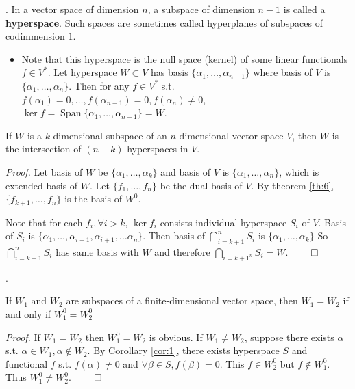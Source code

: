 \documentclass[8pt]{beamer}
\newcommand{\tb}[1]{\textbf{#1}}
\newcommand{\ti}[1]{\textit{#1}}
\newcommand{\Span}{\operatorname{Span}}
\begin{document}
\begin{frame}{.}
    In a vector space of dimension $n$, a subspace of dimension $n-1$ is called a \tb{hyperspace}.
    Such spaces are sometimes called hyperplanes of subspaces of codimmension $1$.

    \begin{itemize}
        \item Note that this hyperspace is the null space (kernel) of some linear functionals $f \in V^\ast$.
        Let hyperspace $W \subset V$ has basis $\{\alpha_1, \dots, \alpha_{n-1}\}$ where basis of $V$ is $\{\alpha_1, \dots, \alpha_n\}$.
        Then for any $f \in V^\ast$ s.t. $f(\alpha_1) =0, \dots, f(\alpha_{n-1}) = 0, f(\alpha_n) \neq 0$, $\ker f = \Span \{\alpha_1, \dots, \alpha_{n-1}\}= W$.
    \end{itemize}

    \begin{corollary} \label{cor:1}
        If $W$ is a $k$-dimensional subspace of an $n$-dimensional vector space $V$, then $W$ is the intersection of $(n-k)$ hyperspaces in $V$.
    \end{corollary}

    \ti{Proof.}
    Let basis of $W$ be $\{\alpha_1, \dots, \alpha_k\}$ and basis of $V$ is $\{\alpha_1, \dots, \alpha_n\}$, which is extended basis of $W$.
    Let $\{f_1, \dots, f_n\}$ be the dual basis of $V$.
    By theorem \ref{th:6}, $\{f_{k+1}, \dots, f_{n}\}$ is the basis of $W^0$.

    Note that for each $f_i, \forall i>k$, $\ker f_i$ consists individual hyperspace $S_i$ of $V$.
    Basis of $S_i$ is $\{\alpha_1, \dots, \alpha_{i-1}, \alpha_{i+1}, \dots \alpha_n\}$.
    Then basis of $\bigcap_{i={k+1}}^n S_i$ is $\{\alpha_1, \dots, \alpha_k\}$
    So $\bigcap_{i={k+1}}^n S_i$ has same basis with $W$ and therefore $\bigcap_{i={k+1}^n} S_i = W$.
    $\qed$
\end{frame}

\begin{frame}{.}
    \begin{corollary}
        If $W_1$ and $W_2$ are subspaces of a finite-dimensional vector space, then $W_1 = W_2$ if and only if $W_1^0 = W_2^0$
    \end{corollary}
    \ti{Proof.} If $W_1 = W_2$ then $W_1^0 = W_2^0$ is obvious.
    If $W_1 \neq W_2$, suppose there exists $\alpha$ s.t. $\alpha \in W_1, \alpha \notin W_2$.
    By Corollary \ref{cor:1}, there exists hyperspace $S$ and functional $f$ s.t. 
    $f(\alpha) \neq 0$  and $\forall \beta \in S, f(\beta) = 0$.
    This $f \in W_2^0$ but $f \notin W_1^0$.
    Thus $W^0_1 \neq W^0_2$.
    $\qed$
\end{frame}
\end{document}
